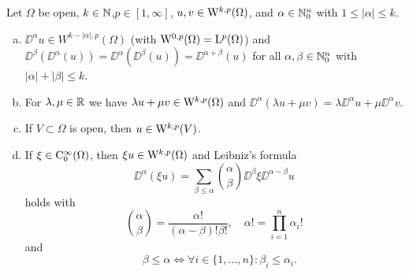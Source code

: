 \begin{prop}
  \label{prop:sobolevProperties}
  Let $\Omega$ be open, $k \in \mathbb{N}$,$p \in [1,\infty]$, $u,v \in \mathrm{W}^{k,p}(\Omega)$, and $\alpha \in \mathbb{N}_0^n$ with $1 \leq |\alpha| \leq k$.
  \begin{enumerate}[a)]
    \item $\DD^\alpha u \in W^{k - |\alpha|,p}(\Omega)$ (with $\mathrm{W}^{0,p}(\Omega) = \mathrm{L}^p(\Omega)$) and $\DD^\beta (\DD^\alpha (u)) = \DD^\alpha (\DD^\beta(u)) = \DD^{\alpha + \beta}(u)$ for all $\alpha, \beta \in \mathbb{N}_0^n$ with $|\alpha| + |\beta| \leq k$.
    \item For $\lambda, \mu \in \mathbb{R}$ we have $\lambda u + \mu v \in \mathrm{W}^{k,p}(\Omega)$ and $\DD^\alpha(\lambda u + \mu v) = \lambda \DD^\alpha u + \mu \DD^\alpha v$.
    \item If $V \subset \Omega$ is open, then $u \in \mathrm{W}^{k,p}(V)$.
    \item If $\xi \in \mathrm{C}_0^\infty(\Omega)$, then $\xi u \in \mathrm{W}^{k,p}(\Omega)$ and Leibniz's formula
      $$
      \DD^\alpha(\xi u) = \sum_{\beta \leq \alpha} \binom{\alpha}{\beta} \DD^\beta\xi \DD^{\alpha - \beta} u
      $$
      holds with 
      $$\binom{\alpha}{\beta} = \frac{\alpha!}{(\alpha -\beta)! \beta!}, \quad \alpha! = \prod_{i = 1}^n \alpha_i!$$
      and
      $$\quad \beta \leq \alpha \iff \forall i \in \{1,\dots,n\}\colon \beta_i \leq \alpha_i.$$
  \end{enumerate}
\end{prop}


